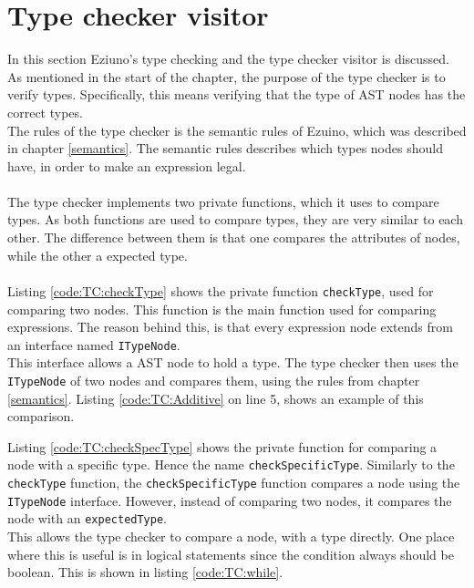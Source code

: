 \section{Type checker visitor}
In this section Eziuno's type checking and the type checker visitor is discussed.\\
As mentioned in the start of the chapter, the purpose of the type checker is to verify types. Specifically, this means verifying that the type of AST nodes has the correct types.\\
The rules of the type checker is the semantic rules of Ezuino, which was described in chapter \ref{semantics}. The semantic rules describes which types nodes should have, in order to make an expression legal.
\\\\
The type checker implements two private functions, which it uses to compare types. As both functions are used to compare types, they are very similar to each other. The difference between them is that one compares the attributes of nodes, while the other a expected type.
\\\\
Listing \ref{code:TC:checkType} shows the private function \texttt{checkType}, used for comparing two nodes. This function is the main function used for comparing expressions. The reason behind this, is that every expression node extends from an interface named \texttt{ITypeNode}.\\
This interface allows a AST node to hold a type. The type checker then uses the \texttt{ITypeNode} of two nodes and compares them, using the rules from chapter \ref{semantics}. Listing \ref{code:TC:Additive} on line 5, shows an example of this comparison.\\

\noindent\newline

\noindent\newline

Listing \ref{code:TC:checkSpecType} shows the private function for comparing a node with a specific type. Hence the name \texttt{checkSpecificType}. Similarly to the \texttt{checkType} function, the \texttt{checkSpecificType} function compares a node using the \texttt{ITypeNode} interface. However, instead of comparing two nodes, it compares the node with an \texttt{expectedType}.\\
This allows the type checker to compare a node, with a type directly. One place where this is useful is in logical statements since the condition always should be boolean. This is shown in listing \ref{code:TC:while}.\\

\noindent\newline

\noindent\newline

